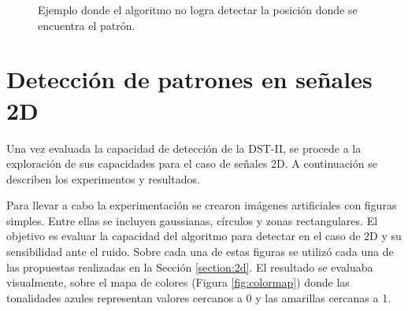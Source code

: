 \begin{figure}
	\caption{Ejemplo donde el algoritmo no logra detectar la posición donde se encuentra el patrón.} \label{fig:failed-example-experiment}
\end{figure}

\section{Detección de patrones en señales 2D}

Una vez evaluada la capacidad de detección de la DST-II, se procede a la exploración de sus capacidades 
para el caso de señales 2D. A continuación se describen los experimentos y resultados.

Para llevar a cabo la experimentación se crearon imágenes artificiales con figuras simples. Entre ellas se incluyen gaussianas,
círculos y zonas rectangulares. El objetivo es evaluar la capacidad del algoritmo para detectar en el caso de 2D
y su sensibilidad ante el ruido. Sobre cada una de estas figuras se utilizó cada una de las propuestas realizadas 
en la Sección \ref{section:2d}.
El resultado se evaluaba visualmente, sobre el  mapa de colores (Figura \ref{fig:colormap}) donde las tonalidades azules representan
valores cercanos a 0 y las amarillas cercanas a 1.

